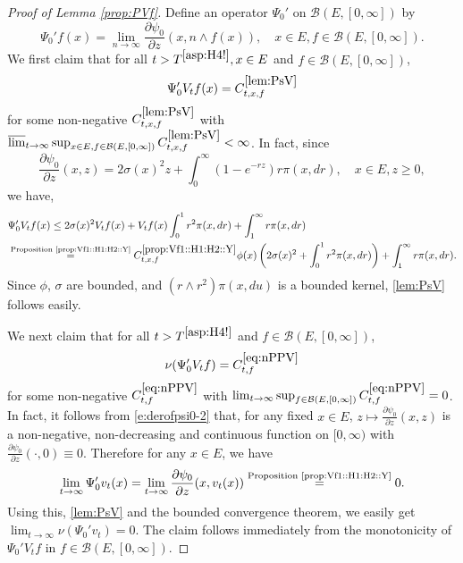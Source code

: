 \documentclass[12pt,a4paper]{amsart}
\numberwithin{equation}{section}
\theoremstyle{plain}
\theoremstyle{definition}
\theoremstyle{remark}
\begin{document}
\begin{proof}[Proof of Lemma \ref{prop:PVf}]
	Define an operator $\Psi_0'$ on $\mathcal B(E,[0,\infty])$ by
\begin{equation}
	\Psi_0' f(x)
	= \lim_{n\to \infty}\frac{\partial \psi_0}{ \partial z} (x, n\wedge f(x)),
	\quad x\in E, f\in \mathcal B(E,[0,\infty]).
\end{equation}
	We first claim that for all $t> T^{\eqref{asp:H4!}}, x\in E$ and $f\in \mathcal B(E,[0,\infty])$,
\begin{equation}
	\Psi_0'V_tf(x) = C^{\eqref{lem:PsV}}_{t,x,f} \label{lem:PsV}
\end{equation}
	for some non-negative $C^{\eqref{lem:PsV}}_{t,x,f}$ with $\varlimsup_{t\to \infty} \sup_{x\in E, f\in \mathcal B(E, [0,\infty])} C^{\eqref{lem:PsV}}_{t,x,f} <\infty$.
	In fact, since
\begin{equation}\label{e:derofpsi0-2}
	\frac{\partial \psi_0 }{ \partial z} (x,z)
	= 2\sigma (x)^2 z + \int_0^\infty (1 - e^{- rz}) r \pi(x,dr),
	\quad x\in E, z\geq 0,
\end{equation}
	we have,
\begin{align}
	&\Psi_0' V_tf(x)
	\leq 2\sigma (x)^2 V_t f(x) + V_t f(x) \int_0^1 r^2 \pi(x,dr) + \int_1^\infty r \pi(x,dr)
	\\&\overset{\text{Proposition \ref{prop:Vf1::H1:H2::Y}}}= C^{\ref{prop:Vf1::H1:H2::Y}}_{t,x,f} \phi(x) \left(2\sigma (x)^2 +\int_0^1 r^2 \pi(x,dr) \right)+ \int_1^\infty r \pi(x,dr).
\end{align}
	Since $\phi$, $\sigma$ are bounded,  and $(r\wedge r^2)\pi(x,du)$ is a bounded kernel, \eqref{lem:PsV} follows easily.
	
	We next claim that for all $t > T^{\eqref{asp:H4!}}$ and $f\in \mathcal B(E,[0,\infty])$,
\begin{equation}
	\nu(\Psi_0' V_t f) = C^{\eqref{eq:nPPV}}_{t,f} \label{eq:nPPV}
\end{equation}
	for some non-negative $C^{\eqref{eq:nPPV}}_{t,f}$ with $\lim_{t\to \infty}\sup_{f\in \mathcal B(E, [0,\infty])} C^{\eqref{eq:nPPV}}_{t,f} = 0$.
	In fact, it follows from \eqref{e:derofpsi0-2} that, for any fixed $x\in E$, $z\mapsto \frac{\partial \psi_0}{\partial z} (x,z)$ is a non-negative, non-decreasing and continuous function on $[0,\infty)$ with $\frac{\partial \psi_0}{\partial z} (\cdot,0) \equiv 0$.
	Therefore for any $x\in E$, we have
\[
	\lim_{t\to \infty} \Psi_0' v_t(x) =\lim_{t\to \infty} \frac{\partial \psi_0}{ \partial z}(x,v_t(x)) \overset{\text{Proposition \ref{prop:Vf1::H1:H2::Y}}}{=} 0.
\]
	Using this, \eqref{lem:PsV} and the bounded convergence theorem, we easily get $\lim_{t\to \infty}\nu(\Psi_0' v_t)  = 0. $ The claim follows immediately from the monotonicity of $\Psi_0' V_t f$ in $f\in \mathcal B(E,[0,\infty])$.
	

\end{proof}
\end{document}
